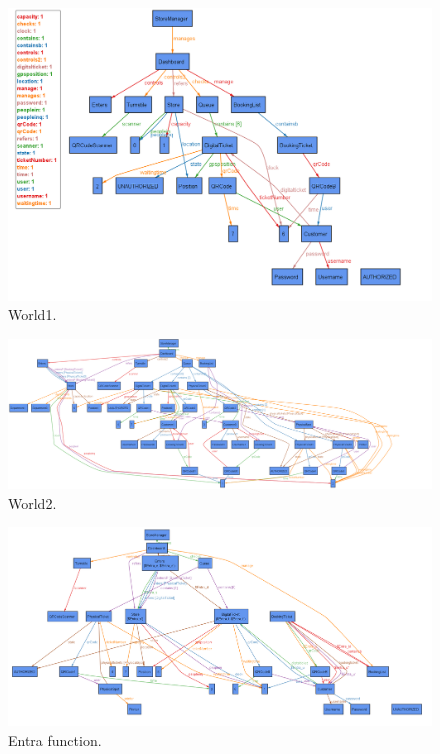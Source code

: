 \begin{figure}
    \includegraphics[width=1.0\textwidth]{images/AlloyW1.png}
    \caption{World1.}
    \label{figure: World1}
\end{figure}

\begin{figure}
    \centering
    \includegraphics[width=1.0\textwidth]{images/world_3.png}
    \caption{World2.}
    \label{figure: World2}
\end{figure}

\begin{figure}
    \centering
    \includegraphics[width=1.0\textwidth]{images/EntraFunction}
    \caption{Entra function.}
    \label{figure: Entra function}
\end{figure}